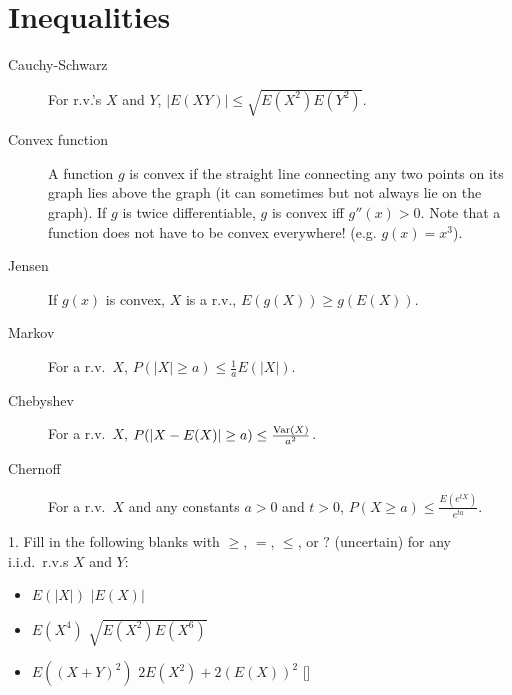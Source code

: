 \documentclass{article}
\begin{document}
 

\header

\section{Inequalities}

\begin{description}
\item[Cauchy-Schwarz] For r.v.'s $X$ and $Y$, $|E(XY)| \leq \sqrt{E(X^2)E(Y^2)}$. 

\item[Convex function] A function $g$ is convex if the straight line connecting any two points on its graph lies above the graph (it can sometimes but not always lie on the graph). If $g$ is twice differentiable, $g$ is convex iff $g''(x) > 0$. Note that a function does not have to be convex everywhere! (e.g. $g(x) = x^3$). 

\item[Jensen] If $g(x)$ is convex, $X$ is a r.v., $E(g(X)) \geq g(E(X))$. 

\item[Markov] For a r.v.~$X$, $P(|X| \geq a) \leq \frac{1}{a}E(|X|)$.  

\item[Chebyshev] For a r.v.~$X$, $P(|X-E(X)| \geq a) \leq \frac{\textrm{Var}(X)}{a^2}$. 

\item[Chernoff] For a r.v.~$X$ and any constants $a>0$ and $t>0$, $P(X \geq a) \leq \frac{E(e^{tX})}{e^{ta}}$. 

\end{description}
1. Fill in the following blanks with $\geq$, $=$, $\leq$, or $?$ (uncertain) for any i.i.d.~r.v.s $X$ and $Y$:
\begin{itemize}
\item $E(|X|)$ \underline{\hspace{1cm}} $|E(X)|$


\item $E(X^4)$ \underline{\hspace{1cm}} $\sqrt{E(X^2)E(X^6)}$


\item $E((X+Y)^2)$ \underline{\hspace{1cm}} $2E(X^2) + 2(E(X))^2$ []


\end{itemize}
\end{document}
